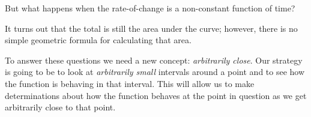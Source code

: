 \documentclass[letterpaper,12pt,fleqn]{article}
\begin{document}
\begin{enumerate}[left=0pt]
  \begin{center}
  \end{center}

  But what happens when the rate-of-change is a non-constant function of time?

  \begin{center}
  \end{center}

  It turns out that the total is still the area under the curve; however, there is no simple geometric formula
  for calculating that area.
\end{enumerate}

\bigskip

To answer these questions we need a new concept: \emph{arbitrarily close}.  Our strategy is going to be to look at
\emph{arbitrarily small} intervals around a point and to see how the function is behaving in that interval.  This
will allow us to make determinations about how the function behaves at the point in question as we get arbitrarily
close to that point.
\end{document}
